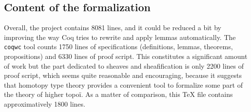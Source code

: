 \documentclass[preprint,9pt,numbers]{sigplanconf}
\DeclareMathOperator{\HProp}{HProp}
\begin{document}
\subsection{Content of the formalization}
\label{sec:cont-form}


Overall, %
the project
contains 8081 lines, and it could be reduced a bit by improving the
way Coq tries to rewrite and apply lemmas automatically. 
The \texttt{coqwc} tool counts 1750 lines of specifications
(definitions, lemmas, theorems, propositions) and 6330 lines of proof
script.
%
This constitutes a significant amount of work but the part dedicated
to sheaves and sheafification is only 2200 lines of proof script,
which seems quite reasonable and encouraging, because it suggests
that homotopy type theory provides a convenient tool to formalize some
part of the theory of higher topoï. As a matter of comparison, this
\TeX\xspace file contains approximatively 1800 lines.
\end{document}
